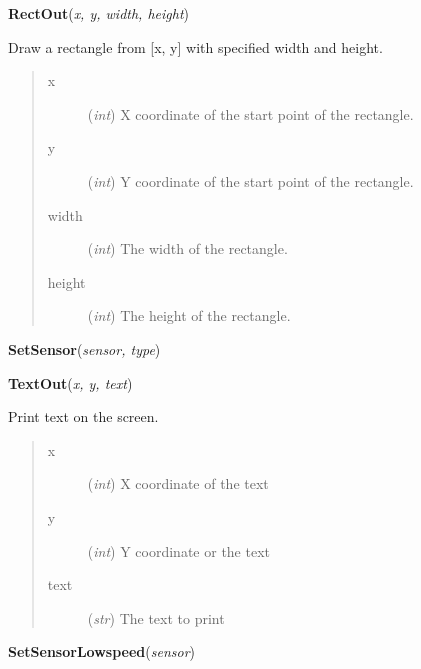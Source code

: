 \documentclass[10pt,a4paper]{article}
\begin{document}
 

\vspace{6pt}
{\bf RectOut}({\it x, y, width, height}) 
    
    Draw a rectangle from [x, y] with specified width and height.





    
    

\begin{quote}
    \begin{description}
        
\item[x] ({\emph{int}}) X coordinate of the start point of the rectangle.

\item[y] ({\emph{int}}) Y coordinate of the start point of the rectangle.

\item[width] ({\emph{int}}) The width of the rectangle.

\item[height] ({\emph{int}}) The height of the rectangle.

    \end{description}
\end{quote}

 

\vspace{6pt}
{\bf SetSensor}({\it sensor, type}) 

 

\vspace{6pt}
{\bf TextOut}({\it x, y, text}) 
    
    Print text on the screen.
    



    

\begin{quote}
    \begin{description}
        
\item[x] ({\emph{int}}) X coordinate of the text

\item[y] ({\emph{int}}) Y coordinate or the text

\item[text] ({\emph{str}}) The text to print

    \end{description}
\end{quote}

 

\vspace{6pt}
{\bf SetSensorLowspeed}({\it sensor}) 
\end{document}

